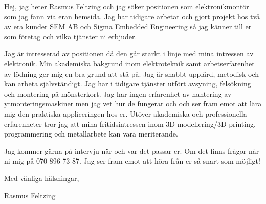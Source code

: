 \documentclass{article}
\begin{document}
Hej, jag heter Rasmus Feltzing och jag söker positionen som elektronikmontör som jag fann via eran hemsida. Jag har tidigare arbetat och gjort projekt hos två av era kunder SEM AB och Sigma Embedded Engineering så jag känner till er som företag och vilka tjänster ni erbjuder. 


Jag är intresserad av positionen då den går starkt i linje med mina intressen av elektronik. Min akademiska bakgrund inom elektroteknik samt arbetserfarenhet av lödning ger mig en bra grund att stå på. Jag är snabbt upplärd, metodisk och kan arbeta självständigt. Jag har i tidigare tjänster utfört avsyning, felsökning och montering på mönsterkort. Jag har ingen erfarenhet av hantering av ytmonteringsmaskiner men jag vet hur de fungerar och och ser fram emot att lära mig den praktiska appliceringen hos er. Utöver akademiska och professionella erfarenheter tror jag att mina fritidsintressen inom 3D-modellering/3D-printing, programmering och metallarbete kan vara meriterande.


Jag kommer gärna på intervju när och var det passar er. Om det finns frågor når ni mig på 070 896 73 87. Jag ser fram emot att höra från er så snart som möjligt! 

\bigskip %

Med vänliga hälsningar,

\vspace{50pt} %

Rasmus Feltzing
\end{document}
